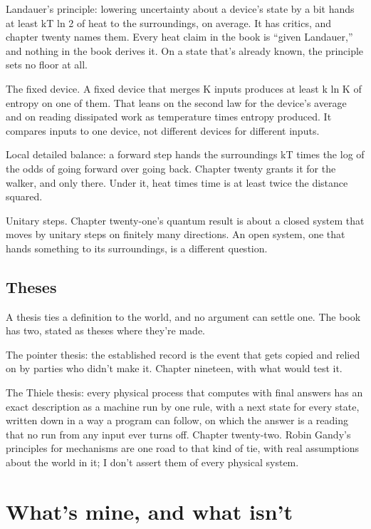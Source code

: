 \documentclass[11pt,twoside]{article}
\theoremstyle{thielethm}
\theoremstyle{thieledef}
\theoremstyle{thieledef}
\theoremstyle{thieledef}
\theoremstyle{thielethm}
\theoremstyle{thieleobs}
\theoremstyle{thielethm}
\begin{document}
Landauer's principle: lowering uncertainty about a device's state by a bit hands at least kT ln 2 of heat to the surroundings, on average. It has critics, and chapter twenty names them. Every heat claim in the book is ``given Landauer,'' and nothing in the book derives it. On a state that's already known, the principle sets no floor at all.

The fixed device. A fixed device that merges K inputs produces at least k ln K of entropy on one of them. That leans on the second law for the device's average and on reading dissipated work as temperature times entropy produced. It compares inputs to one device, not different devices for different inputs.

Local detailed balance: a forward step hands the surroundings kT times the log of the odds of going forward over going back. Chapter twenty grants it for the walker, and only there. Under it, heat times time is at least twice the distance squared.

Unitary steps. Chapter twenty-one's quantum result is about a closed system that moves by unitary steps on finitely many directions. An open system, one that hands something to its surroundings, is a different question.

\subsection{Theses}

A thesis ties a definition to the world, and no argument can settle one. The book has two, stated as theses where they're made.

The pointer thesis: the established record is the event that gets copied and relied on by parties who didn't make it. Chapter nineteen, with what would test it.

The Thiele thesis: every physical process that computes with final answers has an exact description as a machine run by one rule, with a next state for every state, written down in a way a program can follow, on which the answer is a reading that no run from any input ever turns off. Chapter twenty-two. Robin Gandy's principles for mechanisms are one road to that kind of tie, with real assumptions about the world in it; I don't assert them of every physical system.

\section{What's mine, and what isn't}
\label{sec:whats-mine}
\end{document}
